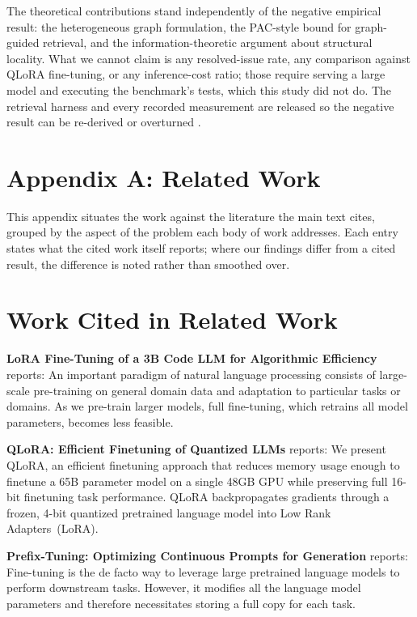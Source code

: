 \documentclass[10pt,twocolumn,letterpaper]{article}
\begin{document}
The theoretical contributions stand independently of the negative empirical result: the heterogeneous graph formulation, the PAC-style bound for graph-guided retrieval, and the information-theoretic argument about structural locality. What we cannot claim is any resolved-issue rate, any comparison against QLoRA fine-tuning, or any inference-cost ratio; those require serving a large model and executing the benchmark's tests, which this study did not do. The retrieval harness and every recorded measurement are released so the negative result can be re-derived or overturned \cite{arxiv_2406_00584,crossref_10_1201_9788743808145_14}.





\section{Appendix A: Related Work}


This appendix situates the work against the literature the main text cites, grouped by the aspect of the problem each body of work addresses. Each entry states what the cited work itself reports; where our findings differ from a cited result, the difference is noted rather than smoothed over.


\section{Work Cited in Related Work}


\textbf{LoRA Fine-Tuning of a 3B Code LLM for Algorithmic Efficiency} \cite{crossref_10_48550_arxiv_2106_09685} reports: An important paradigm of natural language processing consists of large-scale pre-training on general domain data and adaptation to particular tasks or domains. As we pre-train larger models, full fine-tuning, which retrains all model parameters, becomes less feasible.

\textbf{QLoRA: Efficient Finetuning of Quantized LLMs} \cite{crossref_10_48550_arxiv_2305_14314} reports: We present QLoRA, an efficient finetuning approach that reduces memory usage enough to finetune a 65B parameter model on a single 48GB GPU while preserving full 16-bit finetuning task performance. QLoRA backpropagates gradients through a frozen, 4-bit quantized pretrained language model into Low Rank Adapters~(LoRA).

\textbf{Prefix-Tuning: Optimizing Continuous Prompts for Generation} \cite{arxiv_2101_00190} reports: Fine-tuning is the de facto way to leverage large pretrained language models to perform downstream tasks. However, it modifies all the language model parameters and therefore necessitates storing a full copy for each task.
\end{document}
